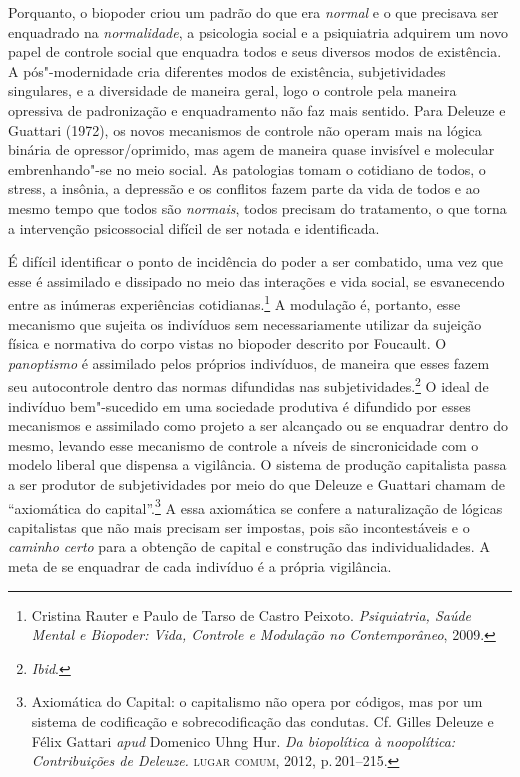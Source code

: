 Porquanto, o biopoder criou um padrão do que era \textit{normal} e o que
precisava ser enquadrado na \textit{normalidade}, a psicologia social e a
psiquiatria adquirem um novo papel de controle social que enquadra todos
e seus diversos modos de existência. A pós"-modernidade cria diferentes
modos de existência, subjetividades singulares, e a diversidade de
maneira geral, logo o controle pela maneira opressiva de padronização e
enquadramento não faz mais sentido. Para Deleuze e Guattari (1972), os
novos mecanismos de controle não operam mais na lógica binária de
opressor/oprimido, mas agem de maneira quase invisível e molecular
embrenhando"-se no meio social. As patologias tomam o cotidiano de todos,
o stress, a insônia, a depressão e os conflitos fazem parte da vida de
todos e ao mesmo tempo que todos são \textit{normais}, todos precisam do
tratamento, o que torna a intervenção psicossocial difícil de ser notada
e identificada.

É difícil identificar o ponto de incidência do poder a ser combatido,
uma vez que esse é assimilado e dissipado no meio das interações e vida
social, se esvanecendo entre as inúmeras experiências cotidianas.\footnote{Cristina Rauter e Paulo de Tarso de Castro Peixoto. \textit{Psiquiatria, Saúde Mental e Biopoder: Vida, Controle e Modulação no Contemporâneo}, 2009.} A modulação é, portanto, esse mecanismo que
sujeita os indivíduos sem necessariamente utilizar da sujeição física e
normativa do corpo vistas no biopoder descrito por Foucault. O
\textit{panoptismo} é assimilado pelos próprios indivíduos, de maneira que esses
fazem seu autocontrole dentro das normas difundidas nas subjetividades.\footnote{\textit{Ibid}.}
O ideal de indivíduo bem"-sucedido em
uma sociedade produtiva é difundido por esses mecanismos e assimilado
como projeto a ser alcançado ou se enquadrar dentro do mesmo, levando
esse mecanismo de controle a níveis de sincronicidade com o modelo
liberal que dispensa a vigilância. O sistema de produção capitalista
passa a ser produtor de subjetividades por meio do que Deleuze e
Guattari chamam de ``axiomática do capital''.\footnote{Axiomática do
  Capital: o capitalismo não opera por códigos, mas por um sistema de
  codificação e sobrecodificação das condutas. Cf. Gilles Deleuze e Félix Gattari
\textit{apud} Domenico Uhng Hur. \textit{Da biopolítica à noopolítica: Contribuições de Deleuze.} \textsc{lugar comum}, 2012, p.\,201--215.} A essa axiomática se confere a
naturalização de lógicas capitalistas que não mais precisam ser
impostas, pois são incontestáveis e o \textit{caminho certo} para a obtenção
de capital e construção das individualidades. A meta de se enquadrar de
cada indivíduo é a própria vigilância.

